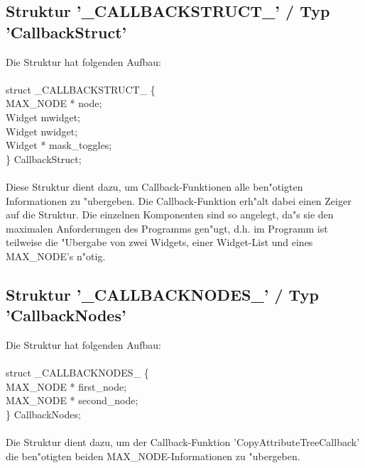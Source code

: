 \subsection{Struktur '\_CALLBACKSTRUCT\_' / Typ 'CallbackStruct'}

Die Struktur hat folgenden Aufbau:\\
\\
struct \_CALLBACKSTRUCT\_ \{\\
\hspace*{1em}   MAX\_NODE * node;\\
\hspace*{1em}   Widget     mwidget;\\
\hspace*{1em}   Widget     nwidget;\\
\hspace*{1em}   Widget *   mask\_toggles;\\
\} CallbackStruct;\\
\\
Diese Struktur dient dazu, um Callback-Funktionen alle ben"otigten Informationen zu "ubergeben. Die Callback-Funktion erh"alt dabei einen Zeiger auf die Struktur. Die einzelnen Komponenten sind so angelegt, da"s sie den maximalen Anforderungen des Programms gen"ugt, d.h. im Programm ist teilweise die "Ubergabe von zwei Widgets, einer Widget-List und eines MAX\_NODE's n"otig.

\subsection{Struktur '\_CALLBACKNODES\_' / Typ 'CallbackNodes'}

Die Struktur hat folgenden Aufbau:\\
\\
struct \_CALLBACKNODES\_ \{\\
  MAX\_NODE * first\_node;\\
  MAX\_NODE * second\_node;\\
\} CallbackNodes;\\
\\
Die Struktur dient dazu, um der Callback-Funktion 'CopyAttributeTreeCallback' die ben"otigten beiden MAX\_NODE-Informationen zu "ubergeben.


